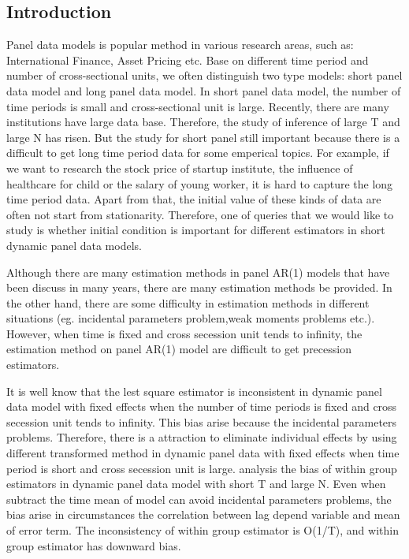 \documentclass[12pt,a4paper,hyperref]{article}
\begin{document}
\subsection{Introduction}
Panel data models is popular method in various research areas, such as: International Finance, Asset Pricing etc. Base on different time period and number of cross-sectional units, we often distinguish two type models: short panel data model and long panel data model. In short panel data model, the number of time periods is small and cross-sectional unit is large. Recently, there are many institutions have large data base. Therefore, the study of inference of large T and large N has risen. But the study for short panel still important because there is a difficult to get long time period data for some emperical topics. For example, if we want to research the stock price of startup institute, the influence of healthcare for child or the salary of young worker, it is hard to capture the long time period data. Apart from that, the initial value of these kinds of data are often not start from stationarity. Therefore, one of queries that we would like to study is whether initial condition is important for different estimators in short dynamic panel data models.      

Although there are many estimation methods in panel AR(1) models that have been discuss in many years, there are many estimation methods be provided. In the other hand, there are some difficulty in estimation methods in different situations (eg. incidental parameters problem,weak moments problems etc.).
 However, when time is fixed and cross secession unit tends to infinity, the estimation method on panel AR(1) model are difficult to get precession estimators.

It is well know that the lest square estimator is inconsistent in dynamic panel data model with fixed effects when the number of time periods is fixed and cross secession unit tends to infinity. This bias arise because the incidental parameters problems. Therefore, there is a attraction to eliminate individual effects by using different transformed method in dynamic panel data with fixed effects when time period is short and cross secession unit is large. \citet{Nickell:1981} analysis the bias of within group estimators in dynamic panel data model with short T and large N. Even when subtract the time mean of model can avoid incidental parameters problems, the bias arise in circumstances the correlation between lag depend variable and mean of error term. The inconsistency of within group estimator is O(1/T), and within group estimator has downward bias.
\end{document}
